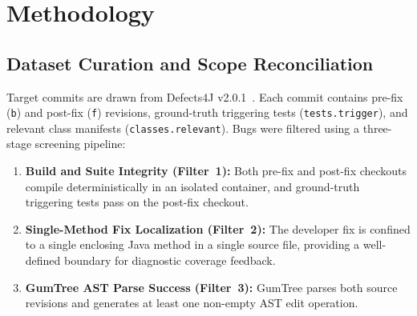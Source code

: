 \documentclass[12pt, a4paper]{article}
\begin{document}
\section{Methodology}\label{sec:methodology}

\subsection{Dataset Curation and Scope Reconciliation}\label{sec:dataset}

Target commits are drawn from Defects4J v2.0.1~\citep{just2014defects4j}.
Each commit contains pre-fix (\texttt{b}) and post-fix (\texttt{f}) revisions, ground-truth triggering tests (\texttt{tests.trigger}), and relevant class manifests (\texttt{classes.relevant}).
Bugs were filtered using a three-stage screening pipeline:

\begin{enumerate}[leftmargin=*]
  \item \textbf{Build and Suite Integrity (Filter~1):} Both pre-fix and post-fix checkouts compile deterministically in an isolated container, and ground-truth triggering tests pass on the post-fix checkout.
  \item \textbf{Single-Method Fix Localization (Filter~2):} The developer fix is confined to a single enclosing Java method in a single source file, providing a well-defined boundary for diagnostic coverage feedback.
  \item \textbf{GumTree AST Parse Success (Filter~3):} GumTree parses both source revisions and generates at least one non-empty AST edit operation.
\end{enumerate}
\end{document}
